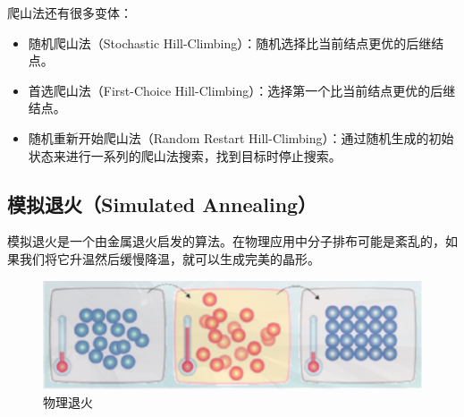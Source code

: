 \begin{figure}[H]
    \centering
\end{figure}

爬山法还有很多变体：

\begin{itemize}
    \item 随机爬山法（Stochastic Hill-Climbing）：随机选择比当前结点更优的后继结点。
    \item 首选爬山法（First-Choice Hill-Climbing）：选择第一个比当前结点更优的后继结点。
    \item 随机重新开始爬山法（Random Restart Hill-Climbing）：通过随机生成的初始状态来进行一系列的爬山法搜索，找到目标时停止搜索。
\end{itemize}

\vspace{0.5cm}

\subsection{模拟退火（Simulated Annealing）}

模拟退火是一个由金属退火启发的算法。在物理应用中分子排布可能是紊乱的，如果我们将它升温然后缓慢降温，就可以生成完美的晶形。\\

\begin{figure}[H]
    \centering
    \includegraphics{img/Chapter1/1-6/2.png}
    \caption{物理退火}
\end{figure}

